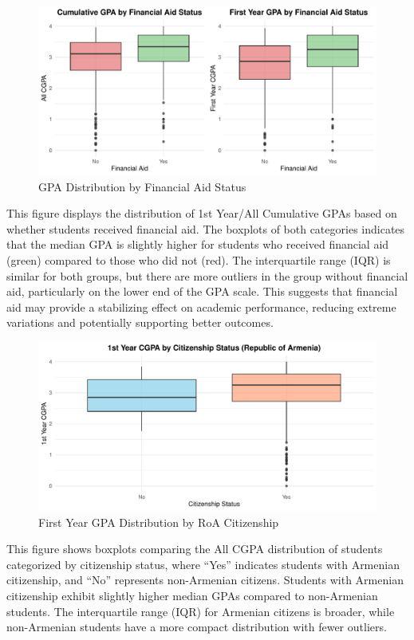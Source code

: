 \documentclass[
  12pt,
]{article}
\begin{document}
\begin{figure}
\includegraphics[width=0.8\linewidth]{iesm315_report_files/figure-latex/unnamed-chunk-10-1} \caption{GPA Distribution by Financial Aid Status}\label{fig:unnamed-chunk-10}
\end{figure}

This figure displays the distribution of 1st Year/All Cumulative GPAs
based on whether students received financial aid. The boxplots of both
categories indicates that the median GPA is slightly higher for students
who received financial aid (green) compared to those who did not (red).
The interquartile range (IQR) is similar for both groups, but there are
more outliers in the group without financial aid, particularly on the
lower end of the GPA scale. This suggests that financial aid may provide
a stabilizing effect on academic performance, reducing extreme
variations and potentially supporting better outcomes.

\newpage

\begin{figure}
\includegraphics[width=0.9\linewidth]{iesm315_report_files/figure-latex/unnamed-chunk-11-1} \caption{First Year GPA Distribution by RoA Citizenship}\label{fig:unnamed-chunk-11}
\end{figure}

This figure shows boxplots comparing the All CGPA distribution of
students categorized by citizenship status, where ``Yes'' indicates
students with Armenian citizenship, and ``No'' represents non-Armenian
citizens. Students with Armenian citizenship exhibit slightly higher
median GPAs compared to non-Armenian students. The interquartile range
(IQR) for Armenian citizens is broader, while non-Armenian students have
a more compact distribution with fewer outliers.
\end{document}
